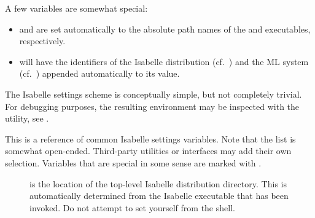 \begin{isabellebody}
\begin{isamarkuptext}
  \medskip A few variables are somewhat special:

  \begin{itemize}

  \item {}\hypertarget{setting.ISABELLE}{\hyperlink{setting.ISABELLE}{\mbox{}}} and \hypertarget{setting.ISATOOL}{\hyperlink{setting.ISATOOL}{\mbox{}}} are set
  automatically to the absolute path names of the \hyperlink{executable.isabelle-process}{\mbox{}} and \hyperlink{executable.isatool}{\mbox{}} executables,
  respectively.
  
  \item {}\hypertarget{setting.ISABELLE-OUTPUT}{\hyperlink{setting.ISABELLE-OUTPUT}{\mbox{}}} will have the identifiers of
  the Isabelle distribution (cf.\ \hyperlink{setting.ISABELLE-IDENTIFIER}{\mbox{}}) and
  the ML system (cf.\ \hyperlink{setting.ML-IDENTIFIER}{\mbox{}}) appended automatically
  to its value.

  \end{itemize}

  \medskip The Isabelle settings scheme is conceptually simple, but
  not completely trivial.  For debugging purposes, the resulting
  environment may be inspected with the \hyperlink{tool.getenv}{\mbox{}} utility, see
  .%
\end{isamarkuptext}%
\isamarkuptrue%
%
\isamarkuptrue%
%
\begin{isamarkuptext}%
This is a reference of common Isabelle settings variables. Note that
  the list is somewhat open-ended. Third-party utilities or interfaces
  may add their own selection. Variables that are special in some
  sense are marked with \isa{{\isachardoublequote}\isactrlsup {\isacharasterisk}{\isachardoublequote}}.

  \begin{description}

  \item[\hypertarget{setting.ISABELLE-HOME}{\hyperlink{setting.ISABELLE-HOME}{\mbox{}}}\isa{{\isachardoublequote}\isactrlsup {\isacharasterisk}{\isachardoublequote}}] is the
  location of the top-level Isabelle distribution directory. This is
  automatically determined from the Isabelle executable that has been
  invoked.  Do not attempt to set \hyperlink{setting.ISABELLE-HOME}{\mbox{}} yourself
  from the shell.
  

\end{description}
\end{isamarkuptext}
\end{isabellebody}
